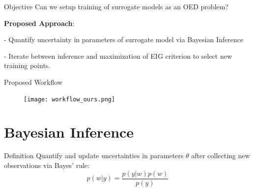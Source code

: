 \documentclass[usenames,dvipsnames,aspectratio=169]{beamer}
\theoremstyle{definition}
\begin{document}
\begin{frame}{Objective}
    Can we setup training of surrogate models as an OED problem?

    \textbf{Proposed Approach}:

    - Quantify uncertainty in parameters of surrogate model via Bayesian Inference

    - Iterate between inference and maximization of EIG criterion to select new training points.
    
\end{frame}

\begin{frame}{Proposed Workflow}
    \begin{figure}
        \centering
        \texttt{[image: workflow\_ours.png]}
    \end{figure}
\end{frame}

\section[Bayesian Inference]{Bayesian Inference}
\begin{frame}{Definition}
Quantify and update uncertainties in parameters $\theta$ after collecting new observations via Bayes' rule:
    $$p(w | y) = \frac{p(y | w) p(w)}{p(y)}$$

    \vspace{-0.5cm}
    
    \begin{minipage}{0.45\linewidth}
        \centering
        \resizebox{0.86\textwidth}{!}{}
    \end{minipage}
    \hfill
    \begin{minipage}{0.45\linewidth}
        \centering
        \resizebox{0.86\textwidth}{!}{} %
    \end{minipage}
\end{frame}
\end{document}
